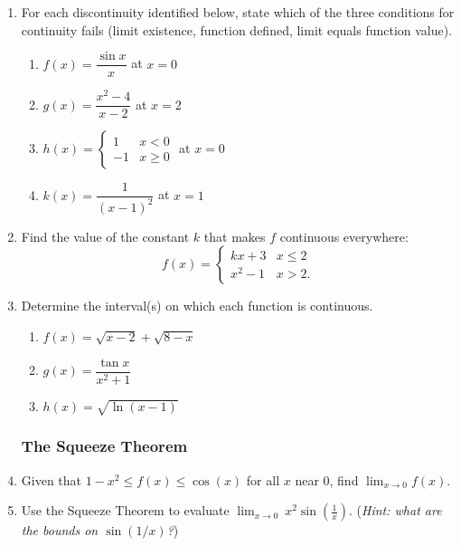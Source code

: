 \begin{enumerate}
\item For each discontinuity identified below, state which of the
      three conditions for continuity fails (limit existence,
      function defined, limit equals function value).
      \begin{enumerate}
        \item $f(x) = \dfrac{\sin x}{x}$ at $x = 0$
        \item $g(x) = \dfrac{x^2 - 4}{x - 2}$ at $x = 2$
        \item $h(x) = \begin{cases} 1 & x < 0 \\ -1 & x \geq 0 \end{cases}$
              at $x = 0$
        \item $k(x) = \dfrac{1}{(x-1)^2}$ at $x = 1$
      \end{enumerate}

\item Find the value of the constant $k$ that makes $f$ continuous
      everywhere:
      \[
        f(x) =
        \begin{cases}
          kx + 3   & x \leq 2 \\
          x^2 - 1  & x > 2.
        \end{cases}
      \]

\item Determine the interval(s) on which each function is
      continuous.
      \begin{enumerate}
        \item $f(x) = \sqrt{x - 2} + \sqrt{8 - x}$
        \item $g(x) = \dfrac{\tan x}{x^2 + 1}$
        \item $h(x) = \sqrt{\ln(x - 1)}$
      \end{enumerate}

\subsubsection*{The Squeeze Theorem}

\item Given that $1 - x^2 \leq f(x) \leq \cos(x)$ for all $x$
      near $0$, find $\displaystyle\lim_{x \to 0} f(x)$.

\item Use the Squeeze Theorem to evaluate
      $\displaystyle\lim_{x \to 0}\ x^2 \sin\!\left(\frac{1}{x}\right)$.
      (\textit{Hint: what are the bounds on $\sin(1/x)$?})


\end{enumerate}
